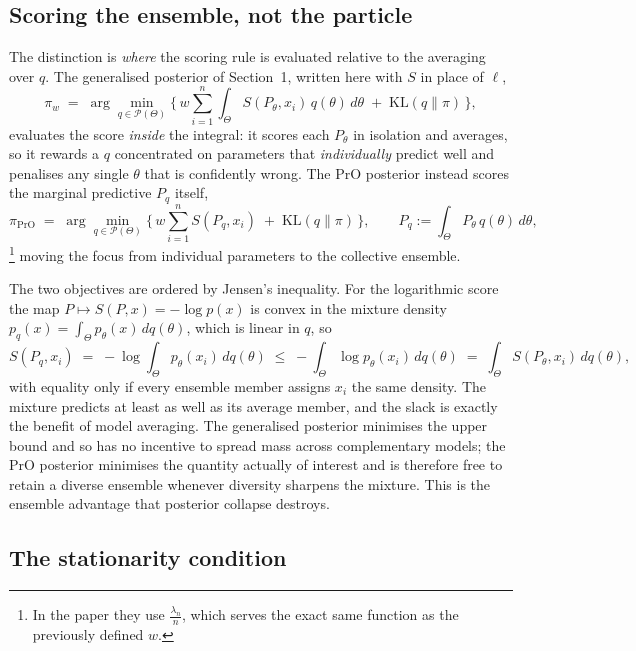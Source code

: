 \documentclass[mstat,12pt]{unswthesis}
\begin{document}
\subsection*{Scoring the ensemble, not the particle}
The distinction is \emph{where} the scoring rule is evaluated relative to the averaging over $q$. The generalised posterior of Section~1, written here with $S$ in place of $\ell$,
$$
    \pi_{w} \;=\; \arg\min_{q\in\mathcal{P}(\Theta)}\Big\{\, w\sum_{i=1}^{n} \int_\Theta S(P_\theta, x_i)\,q(\theta)\,d\theta \;+\; \mathrm{KL}(q\|\pi) \,\Big\},
$$
evaluates the score \emph{inside} the integral: it scores each $P_\theta$ in isolation and averages, so it rewards a $q$ concentrated on parameters that \emph{individually} predict well and penalises any single $\theta$ that is confidently wrong. The PrO posterior instead scores the marginal predictive $P_q$ itself,
$$
    \pi_{\mathrm{PrO}} \;=\; \arg\min_{q\in\mathcal{P}(\Theta)}\Big\{\, w\sum_{i=1}^{n} S(P_q, x_i) \;+\; \mathrm{KL}(q\|\pi) \,\Big\}, \qquad P_q := \int_\Theta P_\theta\, q(\theta)\,d\theta,
$$
\footnote{In the paper they use $\tfrac{\lambda_n}{n}$, which serves the exact same function as the previously defined $w$.}%
moving the focus from individual parameters to the collective ensemble.

The two objectives are ordered by Jensen's inequality. For the logarithmic score the map $P \mapsto S(P, x) = -\log p(x)$ is convex in the mixture density $p_q(x) = \int_\Theta p_\theta(x)\,dq(\theta)$, which is linear in $q$, so
$$
    S(P_q, x_i) \;=\; -\log\!\int_\Theta p_\theta(x_i)\,dq(\theta) \;\le\; -\int_\Theta \log p_\theta(x_i)\,dq(\theta) \;=\; \int_\Theta S(P_\theta, x_i)\,dq(\theta),
$$
with equality only if every ensemble member assigns $x_i$ the same density. The mixture predicts at least as well as its average member, and the slack is exactly the benefit of model averaging. The generalised posterior minimises the upper bound and so has no incentive to spread mass across complementary models; the PrO posterior minimises the quantity actually of interest and is therefore free to retain a diverse ensemble whenever diversity sharpens the mixture. This is the ensemble advantage that posterior collapse destroys.

\subsection*{The stationarity condition}
\end{document}

